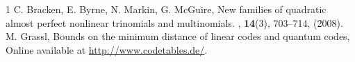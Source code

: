 \documentclass[pdflatex,sn-mathphys-num]{sn-jnl}%
\theoremstyle{thmstyleone}%
\theoremstyle{thmstyletwo}%
\theoremstyle{thmstylethree}%
\begin{document}
\begin{thebibliography}{1}
C. Bracken, E. Byrne, N. Markin, G. McGuire, \newblock New families of quadratic almost perfect nonlinear trinomials and multinomials. , \textbf{14}(3), 703–714, (2008).
	M. Grassl, \newblock Bounds on the minimum distance of linear codes and quantum codes, Online available at \url{http://www.codetables.de/}.
	
	
\end{thebibliography}
\end{document}
